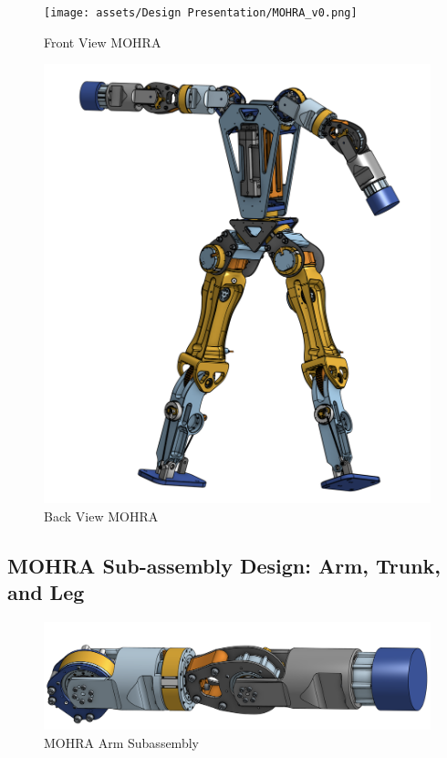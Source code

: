\documentclass{article}
\begin{document}
\begin{figure}[H]
    \centering
    \texttt{[image: assets/Design Presentation/MOHRA\_v0.png]}
    \caption{Front View MOHRA}
    \label{fig:enter-label}
\end{figure}

\begin{figure}[H]
    \centering
    \includegraphics[scale=0.6]{assets/Design Presentation/Back_MOHRA.png}
    \caption{Back View MOHRA}
    \label{fig:enter-label}
\end{figure}



\newpage
\subsection{MOHRA Sub-assembly Design: Arm, Trunk, and Leg}

\begin{figure}[H]
    \centering
    \includegraphics[scale=0.5]{assets/Design Presentation/MOHRA_Arm.png}
    \caption{MOHRA Arm Subassembly}
    \label{fig:enter-label}
\end{figure}
\end{document}
